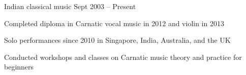 \begin{cventries}
	{Indian classical music} %
	{} %
	{Sept 2003 -- Present} %
	{
		\begin{cvitems} %
			\item Completed diploma in Carnatic vocal music in 2012 and violin in 2013
			\item Solo performances since 2010 in Singapore, India, Australia, and the UK
			\item Conducted workshops and classes on Carnatic music theory and practice for beginners
		\end{cvitems}
	}


\end{cventries}
